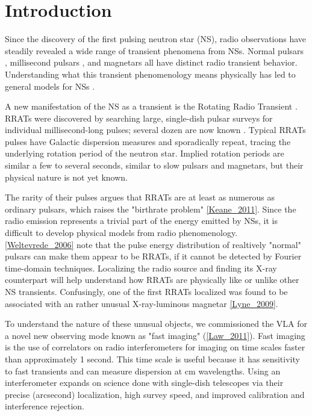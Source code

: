 \section{Introduction}

Since the discovery of the first pulsing neutron star (NS), radio observations have steadily revealed a wide range of transient phenomena from NSs. Normal pulsars \citep{HEWISH_1969}, millisecond pulsars \citep{Backer_1982}, and magnetars \citep{Camilo_2006} all have distinct radio transient behavior. Understanding what this transient phenomenology means physically has led to general models for NSs \citep{Perna_2011}.

A new manifestation of the NS as a transient is the Rotating Radio Transient \citep[RRAT;][]{McLaughlin_2006}. RRATs were discovered by searching large, single-dish pulsar surveys for individual millisecond-long pulses; several dozen are now known \citep{Deneva_2009, Burke_Spolaor_2010, Keane_2011}. Typical RRATs pulses have Galactic dispersion measures and sporadically repeat, tracing the underlying rotation period of the neutron star. Implied rotation periods are similar a few to several seconds, similar to slow pulsars and magnetars, but their physical nature is not yet known. 

The rarity of their pulses argues that RRATs are at least as numerous as ordinary pulsars, which raises the "birthrate problem" \ref{Keane_2011}. Since the radio emission represents a trivial part of the energy emitted by NSs, it is difficult to develop physical models from radio phenomenology. \ref{Weltevrede_2006} note that the pulse energy distribution of realtively "normal" pulsars can make them appear to be RRATs, if it cannot be detected by Fourier time-domain techniques. Localizing the radio source and finding its X-ray counterpart will help understand how RRATs are physically like or unlike other NS transients. Confusingly, one of the first RRATs localized was found to be associated with an rather unusual X-ray-luminous magnetar \ref{Lyne_2009}.

To understand the nature of these unusual objects, we commissioned the VLA for a novel new observing mode known as "fast imaging" (\ref{Law_2011}). Fast imaging is the use of correlators on radio interferometers for imaging on time scales faster than approximately 1 second. This time scale is useful because it has sensitivity to fast transients and can measure dispersion at cm wavelengths. Using an interferometer expands on science done with single-dish telescopes via their precise (arcsecond) localization, high survey speed, and improved calibration and interference rejection.


